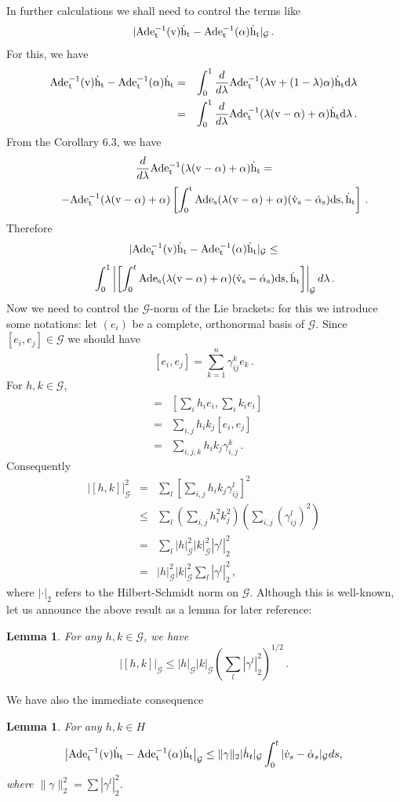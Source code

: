 \documentclass[12pt,a4paper]{book}
\newtheorem{lemma}[theorem]{Lemma}
\newcommand{\Ad}{\rm {Ad}}
\newcommand{\G}{{\mathcal G}}
\begin{document}
In further calculations we shall need to control the terms like
$$
|\Ad e_t^{-1}(v){\dot{h}}_t-\Ad e_t^{-1}(\alpha){\dot{h}}_t|_\G\,.
$$
For this, we have
\begin{eqnarray*}
\Ad e_t^{-1}(v){\dot{h}}_t-\Ad e_t^{-1}(\alpha){\dot{h}}_t&=&
 \int_0^1\frac{d}{d\lambda}\Ad e^{-1}_t(\lambda v+(1-\lambda)\alpha){\dot{h}}_t
   d\lambda\\
  &=&\int_0^1 \frac{d}{d\lambda}\Ad
  e^{-1}_t(\lambda(v-\alpha)+\alpha){\dot{h}}_t d\lambda\,.
\end{eqnarray*}
From the Corollary 6.3, we have
$$
\frac{d}{d\lambda}\Ad e^{-1}_t(\lambda (v-\alpha)+\alpha){\dot{h}}_t=
$$
$$
\qquad -\Ad e^{-1}_t(\lambda(v-\alpha)+\alpha)
\left[\int_0^t\Ad
  e_s(\lambda(v-\alpha)+\alpha)({\dot{v}}_s-{\dot{\alpha}}_s)ds,{\dot{h}}_t\right]\,.
$$
Therefore
$$
|\Ad e_t^{-1}(v){\dot{h}}_t-\Ad e_t^{-1}(\alpha){\dot{h}}_t|_\G \leq
$$
$$
\qquad \int_0^1\left|\left[\int_0^t\Ad e_s(\lambda (v-\alpha)+\alpha)
({\dot{v}}_s-{\dot{\alpha}}_s) ds, {\dot{h}}_t\right]\right|_\G d\lambda\,.
$$
Now we need to control the $\G$-norm of the Lie brackets: for this we introduce
some notations: let $(e_i)$ be a complete, orthonormal basis  of
$\G$. Since $[e_i,e_j]\in \G$ we should have
$$
[e_i,e_j]=\sum_{k=1}^n\gamma_{ij}^ke_k\,.
$$
For $h,k\in \G$,
\begin{eqnarray*}
[h,k]&=&\left[\sum_i h_ie_i,\sum_i k_ie_i\right]\\
    &=&\sum_{i,j}h_i k_j[e_i,e_j]\\
   &=&\sum_{i,j,k}h_i k_j\gamma_{i,j}^k\,.
\end{eqnarray*}
Consequently
\begin{eqnarray*}
|[h,k]|_\G^2&=&\sum_l\left[\sum_{i,j}h_ik_j\gamma_{ij}^l\right]^2\\
       &\leq & \sum_l\left(\sum_{i,j}h_i^2 k_j^2\right)
            \left(\sum_{i,j}(\gamma_{ij}^l)^2\right)\\
      &=&\sum_l |h|_\G^2|k|_\G^2 |\gamma^l|_2^2\\
     &=& |h|_\G^2|k|_\G^2\sum_l |\gamma^l|_2^2\,,
\end{eqnarray*}
where $|\cdot|_2$ refers to the Hilbert-Schmidt norm on $\G$. Although this is
well-known, let us announce the above result as a lemma for later reference:
\begin{lemma}
\label{brac-con}
For any $h,k\in \G$, we have
$$
|[h,k]|_\G\leq |h|_\G|k|_\G\left(\sum_l |\gamma^l|^2_2\right)^{1/2}\,.
$$
\end{lemma}
We have also the immediate consequence
\begin{lemma}
For any $h,k\in H$
$$
\left|\Ad e^{-1}_t(v){\dot{h}}_t-\Ad e^{-1}_t(\alpha){\dot{h}}_t\right|_\G
\leq \|\gamma\|_2 |{\dot{h}}_t|_\G\int_0^t|{\dot{v}}_s-{\dot{\alpha}}_s|_\G ds,
$$
where $\|\gamma\|_2^2=\sum |\gamma^l|_2^2$.
\end{lemma}
\end{document}
